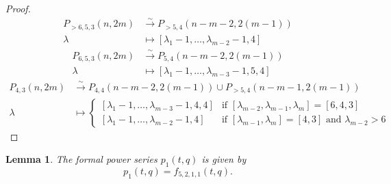 \documentclass[12pt, a4paper]{article}
\newtheorem{lemma}{Lemma}
\begin{document}
\begin{proof}
\begin{align*}
    P_{>6, 5, 3}(n, 2m) &\xrightarrow{\sim} P_{>5, 4}(n - m - 2, 2(m - 1)) \\
    \lambda &\mapsto [\lambda_1 - 1, \dots, \lambda_{m - 2} - 1, 4]
  \end{align*}
  \begin{align*}
    P_{6, 5, 3}(n, 2m) &\xrightarrow{\sim} P_{5, 4}(n - m - 2, 2(m - 1)) \\
    \lambda &\mapsto [\lambda_1 - 1, \dots, \lambda_{m - 3} - 1, 5, 4]
  \end{align*}
  \begin{align*}
    P_{4, 3}(n, 2m) &\xrightarrow{\sim} P_{4, 4}(n - m - 2, 2(m - 1)) \cup P_{>5, 4}(n - m - 1, 2(m - 1)) \\
    \lambda &\mapsto
              \begin{cases}
                [\lambda_1 - 1, \dots, \lambda_{m - 3} - 1, 4, 4] &\text{if }[\lambda_{m - 2}, \lambda_{m - 1}, \lambda_m] = [6, 4, 3] \\
                [\lambda_1 - 1, \dots, \lambda_{m - 2} - 1, 4] &\text{if }[\lambda_{m - 1}, \lambda_m] = [4, 3]\text{ and }\lambda_{m - 2} > 6
              \end{cases}
  \end{align*}
\end{proof}

\begin{lemma}
  \label{lmm:3}
  The formal power series $p_1(t, q)$ is given by
  \begin{equation*}
    p_1(t, q)=f_{5, 2, 1, 1}(t, q).
  \end{equation*}
\end{lemma}
\end{document}
